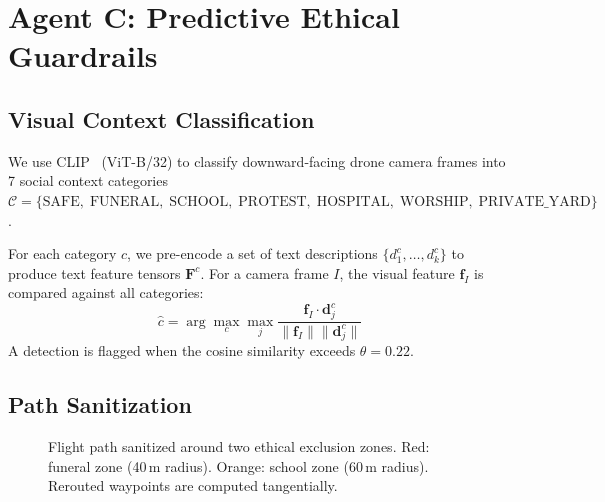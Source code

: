 \documentclass[10pt,twocolumn]{article}
\begin{document}
\section{Agent C: Predictive Ethical Guardrails}
\label{sec:agent_c}

\subsection{Visual Context Classification}
We use CLIP~\cite{radford2021learning} (ViT-B/32) to classify
downward-facing drone camera frames into 7 social context categories
$\mathcal{C} = \{\text{SAFE},\;\text{FUNERAL},\;\text{SCHOOL},\;
\text{PROTEST},\;\text{HOSPITAL},\;\text{WORSHIP},\;\text{PRIVATE\_YARD}\}$.

For each category $c$, we pre-encode a set of text descriptions
$\{d_1^c, \ldots, d_k^c\}$ to produce text feature tensors $\mathbf{F}^c$.
For a camera frame $I$, the visual feature $\mathbf{f}_I$ is compared
against all categories:
\begin{equation}
    \hat{c} = \arg\max_c \max_j \frac{\mathbf{f}_I \cdot \mathbf{d}_j^c}
    {\|\mathbf{f}_I\|\|\mathbf{d}_j^c\|}
\end{equation}
A detection is flagged when the cosine similarity exceeds $\theta = 0.22$.

\subsection{Path Sanitization}

\begin{figure}[t]
    \centering
    \caption{Flight path sanitized around two ethical exclusion zones.
    Red: funeral zone (40\,m radius). Orange: school zone (60\,m
    radius). Rerouted waypoints are computed tangentially.}
    \label{fig:guardrails}
\end{figure}
\end{document}
